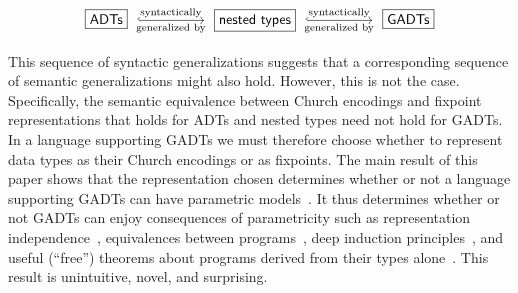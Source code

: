 \documentclass[submission,copyright,creativecommons]{eptcs}
\begin{document}
\vspace*{-0.1in}

\[\begin{tikzcd}[column sep = huge]
\text{\fbox{$\mathsf{ADTs}$}}\;
\ar[r,hookrightarrow,"\text{syntactically}","\text{generalized by}"']
& \;\text{\fbox{$\mathsf{nested~types}$}}\; \ar[r,hookrightarrow,"\text{syntactically}","\text{generalized by}"']
& \;\text{\fbox{$\mathsf{GADTs}$}}
\end{tikzcd}\]

\vspace*{-0.05in}

\noindent
This sequence of syntactic generalizations suggests that a
corresponding sequence of semantic generalizations might also hold.
However, this is not the case. Specifically, the semantic equivalence
between Church encodings and fixpoint representations that holds for
ADTs and nested types need not hold for GADTs. In a language
supporting GADTs we must therefore choose whether to represent data
types as their Church encodings or as fixpoints.  The main result of
this paper shows that the representation chosen determines whether or
not a language supporting GADTs can have parametric
models~\cite{rey83}. It thus determines whether or not GADTs can enjoy
consequences of parametricity such as representation
independence~\cite{adr09,dnb12}, equivalences between
programs~\cite{hd11}, deep induction principles~\cite{jgj21s,jp20},
and useful (``free'') theorems about programs derived from their types
alone~\cite{wad89}.  This result is unintuitive, novel, and
surprising.
\end{document}
